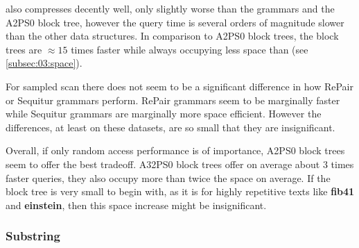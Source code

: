 \documentclass{scrartcl}
\begin{document}
\lzend{} also compresses decently well, only slightly worse than the grammars and the A2PS0 block tree, however the query time is several orders of magnitude slower than the other data structures.
In comparison to A2PS0 block trees, the block trees are $\approx 15$ times faster while always occupying less space than \lzend{} (see \cref{subsec:03:space}).

For sampled scan there does not seem to be a significant difference in how RePair or Sequitur grammars perform.
RePair grammars seem to be marginally faster while Sequitur grammars are marginally more space efficient.
However the differences, at least on these datasets, are so small that they are insignificant.

Overall, if only random access performance is of importance, A2PS0 block trees seem to offer the best tradeoff.
A32PS0 block trees offer on average about $3$ times faster queries, they also occupy more than twice the space on average.
If the block tree is very small to begin with, as it is for highly repetitive texts like \textbf{fib41} and \textbf{einstein}, then this space increase might be insignificant.

\subsubsection{Substring}
\end{document}
